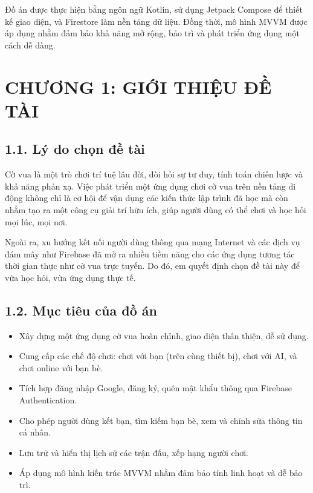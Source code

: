\documentclass[a4paper,12pt]{article}
\begin{document}
\noindent Đồ án được thực hiện bằng ngôn ngữ Kotlin, sử dụng Jetpack Compose để thiết kế giao diện, và Firestore làm nền tảng dữ liệu. Đồng thời, mô hình MVVM được áp dụng nhằm đảm bảo khả năng mở rộng, bảo trì và phát triển ứng dụng một cách dễ dàng.

\bigskip %


\newpage %

\setcounter{page}{1} %

\section*{\centering \textbf{CHƯƠNG 1: GIỚI THIỆU ĐỀ TÀI}} %


\subsection*{1.1. Lý do chọn đề tài} %

\justify %
\noindent Cờ vua là một trò chơi trí tuệ lâu đời, đòi hỏi sự tư duy, tính toán chiến lược và khả năng phản xạ. Việc phát triển một ứng dụng chơi cờ vua trên nền tảng di động không chỉ là cơ hội để vận dụng các kiến thức lập trình đã học mà còn nhằm tạo ra một công cụ giải trí hữu ích, giúp người dùng có thể chơi và học hỏi mọi lúc, mọi nơi.

\noindent Ngoài ra, xu hướng kết nối người dùng thông qua mạng Internet và các dịch vụ đám mây như Firebase đã mở ra nhiều tiềm năng cho các ứng dụng tương tác thời gian thực như cờ vua trực tuyến. Do đó, em quyết định chọn đề tài này để vừa học hỏi, vừa ứng dụng thực tế.

\subsection*{1.2. Mục tiêu của đồ án} %

\justify
\begin{itemize}[label=·] %
    \item Xây dựng một ứng dụng cờ vua hoàn chỉnh, giao diện thân thiện, dễ sử dụng.
    \item Cung cấp các chế độ chơi: chơi với bạn (trên cùng thiết bị), chơi với AI, và chơi online với bạn bè.
    \item Tích hợp đăng nhập Google, đăng ký, quên mật khẩu thông qua Firebase Authentication.
    \item Cho phép người dùng kết bạn, tìm kiếm bạn bè, xem và chỉnh sửa thông tin cá nhân.
    \item Lưu trữ và hiển thị lịch sử các trận đấu, xếp hạng người chơi.
    \item Áp dụng mô hình kiến trúc MVVM nhằm đảm bảo tính linh hoạt và dễ bảo trì.
\end{itemize}
\end{document}
